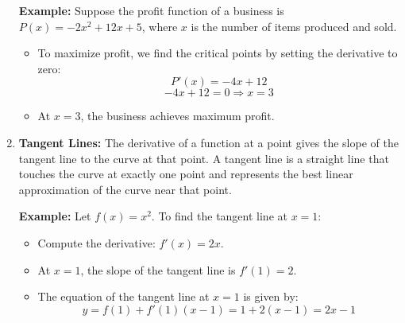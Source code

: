 \begin{enumerate}
    \textbf{Example:} Suppose the profit function of a business is \( P(x) = -2x^2 + 12x + 5 \), where \( x \) is the number of items produced and sold.
    \begin{itemize}
        \item To maximize profit, we find the critical points by setting the derivative to zero:
        \[ P'(x) = -4x + 12 \]
        \[ -4x + 12 = 0 \Rightarrow x = 3 \]
        \item At \( x = 3 \), the business achieves maximum profit.
    \end{itemize}

    \begin{center}
    \end{center}

    \item \textbf{Tangent Lines:} The derivative of a function at a point gives the slope of the tangent line to the curve at that point. A tangent line is a straight line that touches the curve at exactly one point and represents the best linear approximation of the curve near that point.

    \textbf{Example:} Let \( f(x) = x^2 \). To find the tangent line at \( x = 1 \):
    \begin{itemize}
        \item Compute the derivative: \( f'(x) = 2x \).
        \item At \( x = 1 \), the slope of the tangent line is \( f'(1) = 2 \).
        \item The equation of the tangent line at \( x = 1 \) is given by:
        \[ y = f(1) + f'(1)(x - 1) = 1 + 2(x - 1) = 2x - 1 \]
    \end{itemize}


\end{enumerate}
